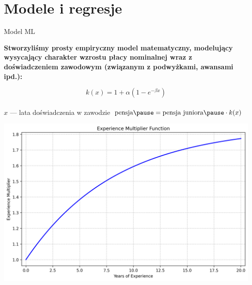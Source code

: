 \section{Modele i regresje}


\begin{frame}[t]{Model ML}

    \textbf{Stworzyliśmy prosty empiryczny model matematyczny,
        modelujący wysycający charakter wzrostu płacy nominalnej wraz z doświadczeniem zawodowym
        (związanym z podwyżkami, awansami ipd.):}

    \pause

    \begin{equation}
    k(x) = 1 + \alpha (1 - e^{-\beta x})
    \end{equation}
    \pause
    \\[.5cm]
    \centering
    $x$ --- lata doświadczenia w zawodzie
    \pause
    $\textrm{pensja} \pause = \textrm{pensja juniora} \pause \cdot k(x)$
\end{frame}

\begin{frame}[plain]
    \includegraphics[width=.8\textwidth]{img/experience_multiplier}
\end{frame}

